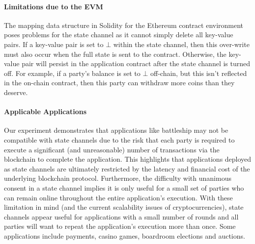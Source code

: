 \documentclass{llncs}
\begin{document}
	\paragraph{Limitations due to the EVM} 
	The mapping data structure in Solidity for the Ethereum contract environment poses problems for the state channel as it cannot simply delete all key-value pairs.
	If a key-value pair is set to $\bot$ within the state channel, then this over-write must also occur when the full state is sent to the contract. 
	Otherwise, the key-value pair will persist in the application contract after the state channel is turned off.
	For example, if a party's balance is set to $\bot$ off-chain, but this isn't reflected in the on-chain contract, then this party can withdraw more coins than they deserve. 
	
	\paragraph{Applicable Applications} 
	Our experiment demonstrates that applications like battleship may not be compatible with state channels due to the risk that each party is required to execute a significant (and unreasonable) number of transactions via the blockchain to complete the application.
	This highlights that applications deployed as state channels are ultimately restricted by the latency and financial cost of the underlying blockchain protocol.
	Furthermore, the difficulty with unanimous consent in a state channel implies it is only useful for a small set of parties who can remain online throughout the entire application's execution. 
	With these limitation in mind (and the current scalability issues of cryptocurrencies), state channels appear useful for applications with a small number of rounds and all parties will want to repeat the application's execution more than once. 
	Some applications include payments, casino games, boardroom elections and auctions.
	
\end{document}
